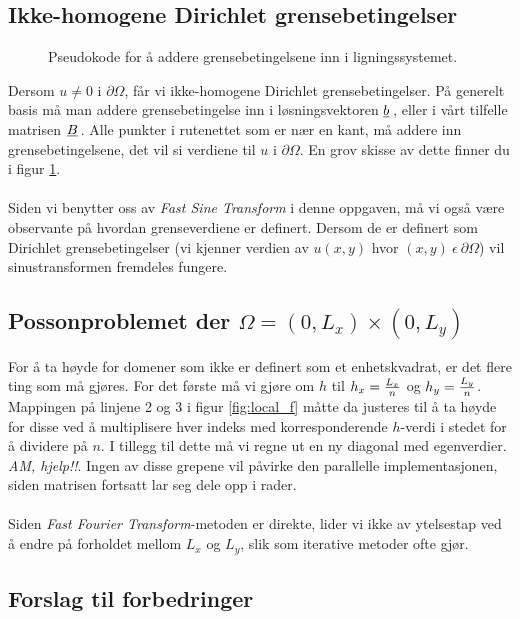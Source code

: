 \documentclass{article}
\newcommand{\ub}[1]{\underbar{$#1$}\,}
\begin{document}
\subsection{Ikke-homogene Dirichlet grensebetingelser}
\begin{figure}[h]
	\centering
	
	\caption{Pseudokode for å addere grensebetingelsene inn i ligningssystemet.}
	\label{fig:non_homogenous_dirichlet}
\end{figure}
Dersom $u \neq 0$ i $\partial\Omega$, får vi ikke-homogene Dirichlet grensebetingelser. På generelt basis må man addere grensebetingelse inn i løsningsvektoren $\ub{b}$, eller i vårt tilfelle matrisen $\ub{B}$. Alle punkter i rutenettet som er nær en kant, må addere inn grensebetingelsene, det vil si verdiene til $u$ i $\partial\Omega$. En grov skisse av dette finner du i figur \ref{fig:non_homogenous_dirichlet}. \\
\\
Siden vi benytter oss av \emph{Fast Sine Transform} i denne oppgaven, må vi også være observante på hvordan grenseverdiene er definert. Dersom de er definert som Dirichlet grensebetingelser (vi kjenner verdien av $u(x, y)$ hvor $(x, y)\ \epsilon\ \partial\Omega$) vil sinustransformen fremdeles fungere.\\

\subsection{Possonproblemet der $\Omega = (0, L_x) \times (0, L_y)$}
For å ta høyde for domener som ikke er definert som et enhetskvadrat, er det flere ting som må gjøres. For det første må vi gjøre om $h$ til $h_x = {L_x \over n}$ og $h_y = {L_y \over n}$. Mappingen på linjene 2 og 3 i figur \ref{fig:local_f} måtte da justeres til å ta høyde for disse ved å multiplisere hver indeks med korresponderende $h$-verdi i stedet for å dividere på $n$. I tillegg til dette må vi regne ut en ny diagonal med egenverdier. \emph{AM, hjelp!!}. Ingen av disse grepene vil påvirke den parallelle implementasjonen, siden matrisen fortsatt lar seg dele opp i rader.\\
\\
Siden \emph{Fast Fourier Transform}-metoden er direkte, lider vi ikke av ytelsestap ved å endre på forholdet mellom $L_x$ og $L_y$, slik som iterative metoder ofte gjør.

\subsection{Forslag til forbedringer}


\end{document}
